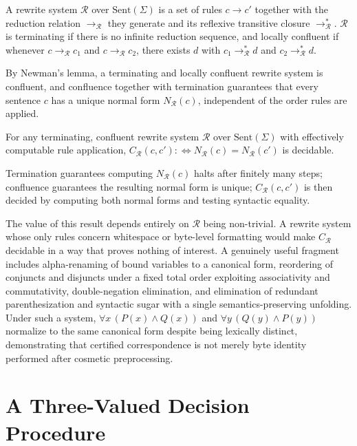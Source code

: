 \begin{definition}
A rewrite system $\mathcal{R}$ over $\mathrm{Sent}(\Sigma)$ is a set of rules $c \to c'$ together with the reduction relation $\to_{\mathcal{R}}$ they generate and its reflexive transitive closure $\to^\ast_{\mathcal{R}}$. $\mathcal{R}$ is terminating if there is no infinite reduction sequence, and locally confluent if whenever $c \to_{\mathcal{R}} c_1$ and $c \to_{\mathcal{R}} c_2$, there exists $d$ with $c_1 \to^\ast_{\mathcal{R}} d$ and $c_2 \to^\ast_{\mathcal{R}} d$.
\end{definition}

By Newman's lemma, a terminating and locally confluent rewrite system is confluent, and confluence together with termination guarantees that every sentence $c$ has a unique normal form $N_{\mathcal{R}}(c)$, independent of the order rules are applied.

\begin{theorem}
For any terminating, confluent rewrite system $\mathcal{R}$ over $\mathrm{Sent}(\Sigma)$ with effectively computable rule application, $C_{\mathcal{R}}(c,c') :\iff N_{\mathcal{R}}(c) = N_{\mathcal{R}}(c')$ is decidable.
\end{theorem}

Termination guarantees computing $N_{\mathcal{R}}(c)$ halts after finitely many steps; confluence guarantees the resulting normal form is unique; $C_{\mathcal{R}}(c,c')$ is then decided by computing both normal forms and testing syntactic equality.

The value of this result depends entirely on $\mathcal{R}$ being non-trivial. A rewrite system whose only rules concern whitespace or byte-level formatting would make $C_{\mathcal{R}}$ decidable in a way that proves nothing of interest. A genuinely useful fragment includes alpha-renaming of bound variables to a canonical form, reordering of conjuncts and disjuncts under a fixed total order exploiting associativity and commutativity, double-negation elimination, and elimination of redundant parenthesization and syntactic sugar with a single semantics-preserving unfolding. Under such a system, $\forall x\,(P(x) \land Q(x))$ and $\forall y\,(Q(y) \land P(y))$ normalize to the same canonical form despite being lexically distinct, demonstrating that certified correspondence is not merely byte identity performed after cosmetic preprocessing.

\section{A Three-Valued Decision Procedure}

